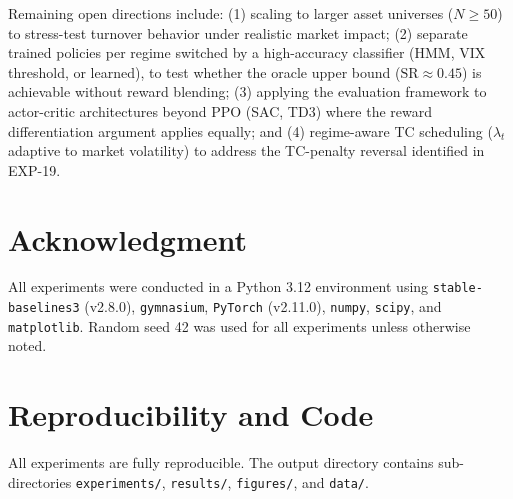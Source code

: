 \documentclass[conference]{IEEEtran}
\begin{document}
Remaining open directions include:
(1) scaling to larger asset universes ($N \geq 50$) to
stress-test turnover behavior under realistic market impact;
(2) separate trained policies per regime switched by a high-accuracy
classifier (HMM, VIX threshold, or learned), to test whether the
oracle upper bound ($\mathrm{SR} \approx 0.45$) is achievable without
reward blending;
(3) applying the evaluation framework to actor-critic
architectures beyond PPO (SAC, TD3) where the reward
differentiation argument applies equally; and
(4) regime-aware TC scheduling ($\lambda_t$ adaptive to
market volatility) to address the TC-penalty reversal
identified in EXP-19.

\section*{Acknowledgment}
All experiments were conducted in a Python 3.12 environment using
\texttt{stable-baselines3} (v2.8.0), \texttt{gymnasium}, \texttt{PyTorch}
(v2.11.0), \texttt{numpy}, \texttt{scipy}, and \texttt{matplotlib}.
Random seed 42 was used for all experiments unless otherwise noted.

\appendix
\section{Reproducibility and Code}

All experiments are fully reproducible. The output directory contains
sub-directories \texttt{experiments/}, \texttt{results/}, \texttt{figures/},
and \texttt{data/}.
\end{document}
